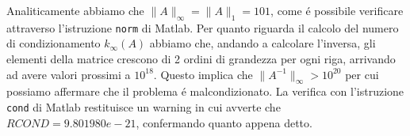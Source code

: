 

Analiticamente abbiamo che $\rVert A \rVert_{\infty} = \rVert A \rVert_1 = 101$, come \'e possibile verificare attraverso l'istruzione \texttt{norm} di Matlab.
Per quanto riguarda il calcolo del numero di condizionamento $\mathit{k_{\infty}}(A)$ abbiamo che, andando a calcolare l'inversa, gli elementi della matrice crescono di 2 ordini di grandezza per ogni riga, arrivando ad avere valori prossimi a $10^{18}$. Questo implica che $\rVert A^{-1} \rVert_{\infty}>10^{20}$ per cui possiamo affermare che il problema \'e malcondizionato.
La verifica con l'istruzione \texttt{cond} di Matlab restituisce un warning in cui avverte che $RCOND=9.801980e-21$, confermando quanto appena detto.